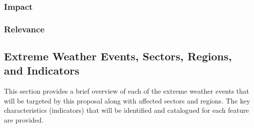 \documentclass[11pt]{article}
\newcommand\citep{\cite}
\begin{document}
\subsubsection{Impact}



\subsubsection{Relevance}






\subsection{Extreme Weather Events, Sectors, Regions, and Indicators} \label{sec:ExtremeWeather}

This section provides a brief overview of each of the extreme weather events that will be targeted by this proposal along with affected sectors and regions.  The key characteristics (indicators) that will be identified and catalogued for each feature are provided.
\end{document}
